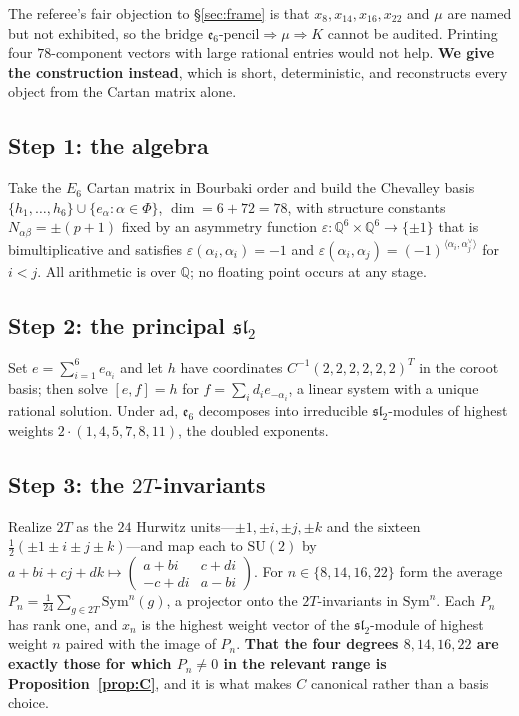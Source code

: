 \documentclass[11pt,reqno]{amsart}
\theoremstyle{plain}
\theoremstyle{definition}
\theoremstyle{remark}
\newcommand{\Q}{\mathbb{Q}}
\newcommand{\SU}{\mathrm{SU}}
\newcommand{\sll}{\mathfrak{sl}}
\newcommand{\ee}{\mathfrak{e}}
\begin{document}
The referee's fair objection to \S\ref{sec:frame} is that $x_8,x_{14},x_{16},x_{22}$
and $\mu$ are named but not exhibited, so the bridge
$\ee_6\text{-pencil}\Rightarrow\mu\Rightarrow K$ cannot be audited. Printing four
$78$-component vectors with large rational entries would not help. \textbf{We give the
construction instead}, which is short, deterministic, and reconstructs every object
from the Cartan matrix alone.

\subsection*{Step 1: the algebra}
Take the $E_6$ Cartan matrix in Bourbaki order and build the Chevalley basis
$\{h_1,\dots,h_6\}\cup\{e_\alpha:\alpha\in\Phi\}$, $\dim=6+72=78$, with structure
constants $N_{\alpha\beta}=\pm(p+1)$ fixed by an asymmetry function
$\varepsilon:\Q^6\times\Q^6\to\{\pm1\}$ that is bimultiplicative and satisfies
$\varepsilon(\alpha_i,\alpha_i)=-1$ and
$\varepsilon(\alpha_i,\alpha_j)=(-1)^{\langle\alpha_i,\alpha_j^\vee\rangle}$ for $i<j$.
All arithmetic is over $\Q$; no floating point occurs at any stage.

\subsection*{Step 2: the principal $\sll_2$}
Set $e=\sum_{i=1}^{6}e_{\alpha_i}$ and let $h$ have coordinates $C^{-1}(2,2,2,2,2,2)^{T}$
in the coroot basis; then solve $[e,f]=h$ for $f=\sum_i d_i e_{-\alpha_i}$, a linear
system with a unique rational solution. Under $\mathrm{ad}$, $\ee_6$ decomposes into
irreducible $\sll_2$-modules of highest weights $2\cdot(1,4,5,7,8,11)$, the doubled
exponents.

\subsection*{Step 3: the $2T$-invariants}
Realize $2T$ as the $24$ Hurwitz units---$\pm1,\pm i,\pm j,\pm k$ and the sixteen
$\tfrac12(\pm1\pm i\pm j\pm k)$---and map each to $\SU(2)$ by
$a+bi+cj+dk\mapsto\left(\begin{smallmatrix}a+bi&c+di\\-c+di&a-bi\end{smallmatrix}\right)$.
For $n\in\{8,14,16,22\}$ form the average
$P_n=\frac{1}{24}\sum_{g\in2T}\mathrm{Sym}^n(g)$, a projector onto the
$2T$-invariants in $\mathrm{Sym}^n$. Each $P_n$ has rank one, and $x_n$ is the highest
weight vector of the $\sll_2$-module of highest weight $n$ paired with the image of
$P_n$. \textbf{That the four degrees $8,14,16,22$ are exactly those for which $P_n\neq0$
in the relevant range is Proposition~\ref{prop:C}}, and it is what makes $C$ canonical
rather than a basis choice.
\end{document}
